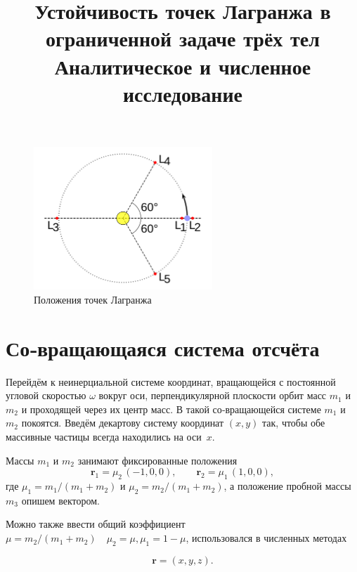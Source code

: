 \documentclass[12pt]{article}
\title{Устойчивость точек Лагранжа в ограниченной задаче трёх тел\\\small Аналитическое и численное исследование}
\author{}
\date{}
\newcommand{\rvec}{\mathbf r}
\newcommand{\rone}{\mathbf r_1}
\newcommand{\rtwo}{\mathbf r_2}
\newcommand{\muone}{\mu_1}
\newcommand{\mutwo}{\mu_2}
\begin{document}
\maketitle
\tableofcontents
\bigskip

\begin{figure}[H]
  \centering
  \includegraphics[width=0.6\textwidth]{image.png}
  \caption{Положения точек Лагранжа}
  \label{fig:lagr}
\end{figure}

\section{Со‑вращающаяся система отсчёта}\label{sec:corot}

Перейдём к неинерциальной системе координат, вращающейся с постоянной угловой скоростью $\omega$ вокруг оси, перпендикулярной плоскости орбит масс $m_1$ и $m_2$ и проходящей через их центр масс. В такой со‑вращающейся системе $m_1$ и $m_2$ покоятся. Введём декартову систему координат $(x,y)$ так, чтобы обе массивные частицы всегда находились на оси~$x$.

Массы $m_1$ и $m_2$ занимают фиксированные положения
\begin{equation}\label{eq:r1r2}
  \rone = \mutwo\,(-1,0,0),\qquad
  \rtwo = \muone\,(1,0,0),
\end{equation}
где $\mu_1=m_1/(m_1+m_2)$ и $\mu_2=m_2/(m_1+m_2)$, а положение пробной массы $m_3$ опишем вектором. 

Можно также ввести общий коэффициент $ \mu=m_2/(m_1+m_2) \quad \mu_2 = \mu, \mu_1 = 1 - \mu$, использовался в численных методах

\begin{equation}\label{eq:rvec}
  \rvec = (x,y,z).
\end{equation}
\end{document}
